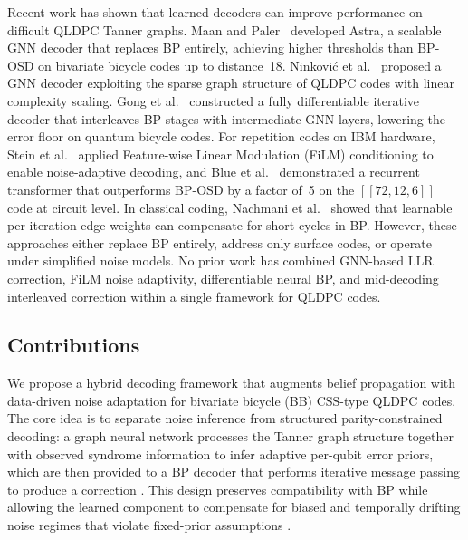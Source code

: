\documentclass[a4paper,twocolumn,11pt,unpublished,nopdfoutputerror]{quantumarticle}
\newcommand{\code}[3]{\ensuremath{[\![#1,#2,#3]\!]}}
\begin{document}
Recent work has shown that learned decoders can improve performance on difficult QLDPC Tanner graphs. Maan and Paler~\cite{Maan2025MLBP} developed Astra, a scalable GNN decoder that replaces BP entirely, achieving higher thresholds than BP-OSD on bivariate bicycle codes up to distance~18. Ninkovi\'{c} et al.~\cite{Ninkovic2024GNN} proposed a GNN decoder exploiting the sparse graph structure of QLDPC codes with linear complexity scaling. Gong et al.~\cite{Gong2024GNN} constructed a fully differentiable iterative decoder that interleaves BP stages with intermediate GNN layers, lowering the error floor on quantum bicycle codes. For repetition codes on IBM hardware, Stein et al.~\cite{Stein2026FiLM} applied Feature-wise Linear Modulation (FiLM) conditioning to enable noise-adaptive decoding, and Blue et al.~\cite{Blue2026MLBB} demonstrated a recurrent transformer that outperforms BP-OSD by a factor of~5 on the $\code{72}{12}{6}$ code at circuit level. In classical coding, Nachmani et al.~\cite{Nachmani2016Learning,Nachmani2018Deep} showed that learnable per-iteration edge weights can compensate for short cycles in BP. However, these approaches either replace BP entirely, address only surface codes, or operate under simplified noise models. No prior work has combined GNN-based LLR correction, FiLM noise adaptivity, differentiable neural BP, and mid-decoding interleaved correction within a single framework for QLDPC codes.

\subsection{Contributions}

We propose a hybrid decoding framework that augments belief propagation with data-driven noise adaptation for bivariate bicycle (BB) CSS-type QLDPC codes. The core idea is to separate noise inference from structured parity-constrained decoding: a graph neural network processes the Tanner graph structure together with observed syndrome information to infer adaptive per-qubit error priors, which are then provided to a BP decoder that performs iterative message passing to produce a correction \cite{Roffe2020Landscape}. This design preserves compatibility with BP while allowing the learned component to compensate for biased and temporally drifting noise regimes that violate fixed-prior assumptions \cite{Tuckett2018Bias}.
\end{document}

